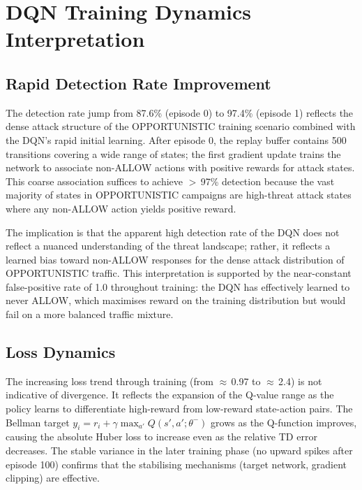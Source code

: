 \section{DQN Training Dynamics Interpretation}
\label{sec:disc_dqn}

\subsection{Rapid Detection Rate Improvement}

The detection rate jump from 87.6\% (episode 0) to 97.4\% (episode 1)
reflects the dense attack structure of the OPPORTUNISTIC training scenario
combined with the DQN's rapid initial learning.
After episode 0, the replay buffer contains 500 transitions covering a wide
range of states; the first gradient update trains the network to associate
non-ALLOW actions with positive rewards for attack states.
This coarse association suffices to achieve $>$\,97\% detection because the
vast majority of states in OPPORTUNISTIC campaigns are high-threat attack
states where any non-ALLOW action yields positive reward.

The implication is that the apparent high detection rate of the DQN does not
reflect a nuanced understanding of the threat landscape; rather, it reflects
a learned bias toward non-ALLOW responses for the dense attack distribution
of OPPORTUNISTIC traffic.
This interpretation is supported by the near-constant false-positive rate
of 1.0 throughout training: the DQN has effectively learned to never ALLOW,
which maximises reward on the training distribution but would fail on a more
balanced traffic mixture.

\subsection{Loss Dynamics}

The increasing loss trend through training (from $\approx$\,0.97 to
$\approx$\,2.4) is not indicative of divergence.
It reflects the expansion of the Q-value range as the policy learns to
differentiate high-reward from low-reward state-action pairs.
The Bellman target $y_i = r_i + \gamma \max_{a'} Q(s', a'; \theta^-)$
grows as the Q-function improves, causing the absolute Huber loss to
increase even as the relative TD error decreases.
The stable variance in the later training phase (no upward spikes after
episode 100) confirms that the stabilising mechanisms (target network,
gradient clipping) are effective.

